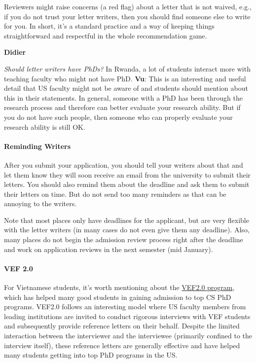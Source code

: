 \documentclass[oneside,11pt]{book}
\newenvironment{commentbox}[1][]{
  \small
  \begin{mybox}
    {\small \textbf{#1}}
  }{
  \end{mybox}
}
\begin{document}
Reviewers might raise concerns (a red flag) about  a letter that is not waived, e.g., if you do not trust your letter writers, then you should find someone else to write for you. In short, it's a standard practice and a way of keeping things straightforward and respectful in the whole recommendation game.

\begin{commentbox}[Didier]
  \emph{Should letter writers have PhDs?}  In Rwanda, a lot of students interact more with teaching faculty who might not have PhD.
  \tcblower
  \textbf{Vu}: This is an interesting and useful detail that US faculty might not be aware of and students should mention about this in their statements. In general, someone with a PhD has been through the research process and therefore can better evaluate your research ability.  But if you do not have such people, then someone who can properly evaluate your research ability is still OK.
\end{commentbox}

\paragraph{Reminding Writers} After you submit your application, you should tell your writers about that and let them know they will soon receive an email from the university to submit their letters.  You should also remind them about the deadline and ask them to submit their letters on time.  But do not send too many reminders as that can be annoying to the writers.

Note that most places only have deadlines for the applicant, but are very flexible with the letter writers (in many cases do not even give them any deadline).  Also, many places do not begin the admission review process right after the deadline and work on application reviews in the next semester (mid January).


\paragraph{VEF 2.0} For Vietnamese students, it's worth mentioning about the \href{https://vef2.org/}{VEF2.0 program}, which has helped many good students in gaining admission to top CS PhD programs. VEF2.0 follows an interesting model where US faculty members from leading institutions are invited to conduct rigorous interviews with VEF students and subsequently provide reference letters on their behalf. Despite the limited interaction between the interviewer and the interviewee (primarily confined to the interview itself), these reference letters are generally effective and have helped many students getting into top PhD programs in the US.
\end{document}
